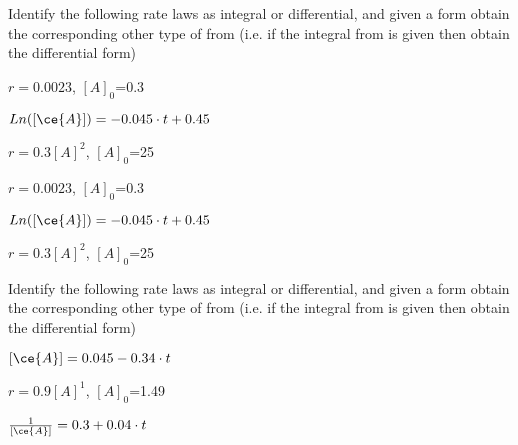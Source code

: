 \documentclass[main.tex]{subfiles}
\begin{document}
\begin{multicols*}{2}
\begin{question}[ID=\the\value{numA}]
Identify the following rate laws as integral or differential, and given a form obtain the corresponding other type of from (i.e. if the integral from is given then obtain the differential form)
\begin{inparaenum}[(a)]
\item 	  $r=0.0023$, $[A]_0$=0.3  	%
\item $Ln([\ce{A}])=-0.045\cdot t+0.45$	%
\item 	   $r=0.3[A]^2$, $[A]_0$=25   	%
\end{inparaenum}
\end{question}
\begin{solution}
\begin{inparaenum}[(a)]
\item 	  $r=0.0023$, $[A]_0$=0.3  	%
\item $Ln([\ce{A}])=-0.045\cdot t+0.45$	%
\item 	   $r=0.3[A]^2$, $[A]_0$=25   	%
\end{inparaenum}\hspace{0.1cm}\end{solution}%


\begin{question}[ID=\the\value{numA}]
Identify the following rate laws as integral or differential, and given a form obtain the corresponding other type of from (i.e. if the integral from is given then obtain the differential form)
\begin{inparaenum}[(a)]

\item $[\ce{A}] =0.045 -0.34\cdot t $	 	%
\item 	   $r=0.9[A]^1$, $[A]_0$=1.49   %
\item $\frac{1}{[\ce{A}]}=0.3+0.04\cdot t $	%
\end{inparaenum}
\end{question}
\begin{solution}
\begin{inparaenum}[(a)]


\end{inparaenum}
\end{solution}
\end{multicols*}
\end{document}
